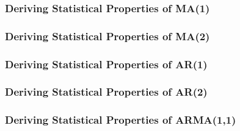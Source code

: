 \documentclass[11pt]{article}
\begin{document}
\subsubsection{Deriving Statistical Properties of MA(1)}

\subsubsection{Deriving Statistical Properties of MA(2)}

\subsubsection{Deriving Statistical Properties of AR(1)}

\subsubsection{Deriving Statistical Properties of AR(2)}

\subsubsection{Deriving Statistical Properties of ARMA(1,1)}
\end{document}
